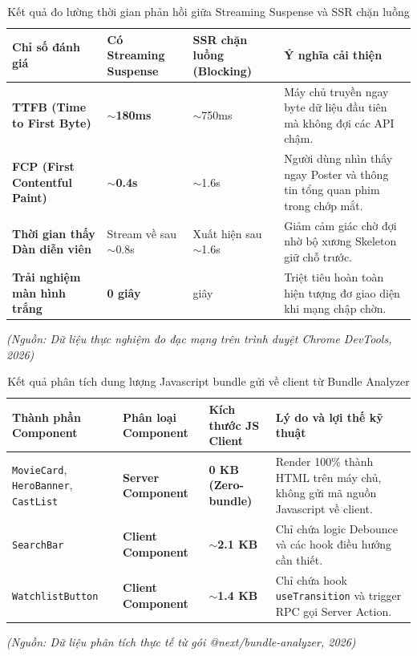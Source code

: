 \documentclass[13pt,a4paper]{extarticle}
\begin{document}
\begin{table}[H]
\centering
\caption{Kết quả đo lường thời gian phản hồi giữa Streaming Suspense và SSR chặn luồng}
\label{tab:streaming_metrics}
\begin{tabularx}{\textwidth}{>{\raggedright\arraybackslash}p{4.5cm}>{\centering\arraybackslash}p{3.2cm}>{\centering\arraybackslash}p{3.2cm}>{\raggedright\arraybackslash}X}
\toprule
\textbf{Chỉ số đánh giá} & \textbf{Có Streaming Suspense} & \textbf{SSR chặn luồng (Blocking)} & \textbf{Ý nghĩa cải thiện} \\
\midrule
\textbf{TTFB (Time to First Byte)} & \textbf{$\sim$180ms} & $\sim$750ms & Máy chủ truyền ngay byte dữ liệu đầu tiên mà không đợi các API chậm. \\
\midrule
\textbf{FCP (First Contentful Paint)} & \textbf{$\sim$0.4s} & $\sim$1.6s & Người dùng nhìn thấy ngay Poster và thông tin tổng quan phim trong chớp mắt. \\
\midrule
\textbf{Thời gian thấy Dàn diễn viên} & Stream về sau $\sim$0.8s & Xuất hiện sau $\sim$1.6s & Giảm cảm giác chờ đợi nhờ bộ xương Skeleton giữ chỗ trước. \\
\midrule
\textbf{Trải nghiệm màn hình trắng} & \textbf{0 giây} & 1.6 giây & Triệt tiêu hoàn toàn hiện tượng đơ giao diện khi mạng chập chờn. \\
\bottomrule
\end{tabularx}
\end{table}
\begin{flushleft}\small\textit{(Nguồn: Dữ liệu thực nghiệm đo đạc mạng trên trình duyệt Chrome DevTools, 2026)}\end{flushleft}

\begin{table}[H]
\centering
\caption{Kết quả phân tích dung lượng Javascript bundle gửi về client từ Bundle Analyzer}
\label{tab:bundle_metrics}
\begin{tabularx}{\textwidth}{>{\raggedright\arraybackslash}p{4cm}>{\centering\arraybackslash}p{3cm}>{\centering\arraybackslash}p{3cm}>{\raggedright\arraybackslash}X}
\toprule
\textbf{Thành phần Component} & \textbf{Phân loại Component} & \textbf{Kích thước JS Client} & \textbf{Lý do và lợi thế kỹ thuật} \\
\midrule
\texttt{MovieCard}, \texttt{HeroBanner}, \texttt{CastList} & \textbf{Server Component} & \textbf{0 KB (Zero-bundle)} & Render 100\% thành HTML trên máy chủ, không gửi mã nguồn Javascript về client. \\
\midrule
\texttt{SearchBar} & \textbf{Client Component} & \textbf{$\sim$2.1 KB} & Chỉ chứa logic Debounce và các hook điều hướng cần thiết. \\
\midrule
\texttt{WatchlistButton} & \textbf{Client Component} & \textbf{$\sim$1.4 KB} & Chỉ chứa hook \texttt{useTransition} và trigger RPC gọi Server Action. \\
\bottomrule
\end{tabularx}
\end{table}
\begin{flushleft}\small\textit{(Nguồn: Dữ liệu phân tích thực tế từ gói @next/bundle-analyzer, 2026)}\end{flushleft}
\end{document}
